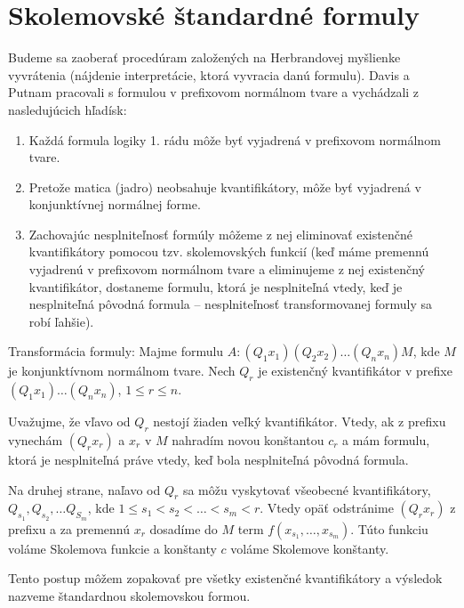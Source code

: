 \section{Skolemovské štandardné formuly}

\startFIXME

Budeme sa zaoberať procedúram založených na Herbrandovej myšlienke vyvrátenia 
(nájdenie interpretácie, ktorá vyvracia danú formulu).
Davis a Putnam pracovali s formulou v prefixovom
normálnom tvare a vychádzali z nasledujúcich hľadísk:
\begin{enumerate}
    \item Každá formula logiky 1. rádu
        môže byť vyjadrená v prefixovom normálnom tvare.

    \item Pretože matica (jadro) neobsahuje kvantifikátory, môže byť
        vyjadrená v konjunktívnej normálnej forme.

    \item Zachovajúc nesplniteľnosť formúly môžeme z nej eliminovať
        existenčné kvantifikátory pomocou tzv. skolemovských funkcií (keď máme
        premennú vyjadrenú v prefixovom normálnom tvare a eliminujeme z nej
        existenčný kvantifikátor, dostaneme formulu, ktorá je nesplniteľná
        vtedy, keď je nesplniteľná pôvodná formula -- nesplniteľnosť
        transformovanej formuly sa robí ľahšie).
\end{enumerate}

Transformácia formuly:
Majme formulu $A: (Q_1 x_1) (Q_2 x_2) \ldots (Q_n x_n) M$,
kde $M$ je konjunktívnom normálnom tvare.
Nech $Q_r$ je existenčný kvantifikátor v prefixe $(Q_1 x_1) \ldots
(Q_n x_n)$, $1 \le r \le n$.

Uvažujme, že vľavo od $Q_r$ nestojí žiaden veľký kvantifikátor.
Vtedy, ak z prefixu vynechám $(Q_r x_r)$ a $x_r$ v $M$ nahradím
novou konštantou $c_r$ a mám formulu, ktorá je nesplniteľná práve
vtedy, keď bola nesplniteľná pôvodná formula.

Na druhej strane, naľavo od $Q_r$ sa môžu vyskytovať všeobecné
kvantifikátory, $Q_{s_1}, Q_{s_2}, \dots Q_{S_m}$,
kde $1 \le s_1 < s_2 < \dots < s_m < r$.
Vtedy opäť odstránime $(Q_r x_r)$ z prefixu a
za premennú $x_r$ dosadíme do $M$ term 
$f(x_{s_1}, \ldots, x_{s_m})$. Túto funkciu voláme Skolemova funkcie a
konštanty $c$ voláme Skolemove konštanty.

Tento postup môžem zopakovať pre všetky existenčné kvantifikátory a
výsledok nazveme štandardnou skolemovskou formou.

